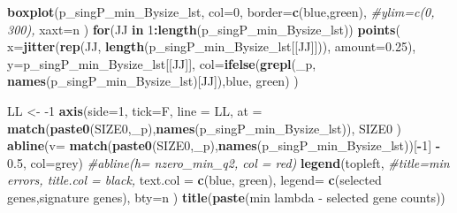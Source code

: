 \documentclass[
]{book}
\newenvironment{Shaded}{\begin{snugshade}}{\end{snugshade}}
\newcommand{\CommentTok}[1]{\textcolor[rgb]{0.56,0.35,0.01}{\textit{#1}}}
\newcommand{\ControlFlowTok}[1]{\textcolor[rgb]{0.13,0.29,0.53}{\textbf{#1}}}
\newcommand{\DataTypeTok}[1]{\textcolor[rgb]{0.13,0.29,0.53}{#1}}
\newcommand{\DecValTok}[1]{\textcolor[rgb]{0.00,0.00,0.81}{#1}}
\newcommand{\FloatTok}[1]{\textcolor[rgb]{0.00,0.00,0.81}{#1}}
\newcommand{\KeywordTok}[1]{\textcolor[rgb]{0.13,0.29,0.53}{\textbf{#1}}}
\newcommand{\NormalTok}[1]{#1}
\newcommand{\OperatorTok}[1]{\textcolor[rgb]{0.81,0.36,0.00}{\textbf{#1}}}
\newcommand{\StringTok}[1]{\textcolor[rgb]{0.31,0.60,0.02}{#1}}
\begin{document}
\begin{Shaded}
\begin{Highlighting}[]
\KeywordTok{boxplot}\NormalTok{(p\_singP\_min\_Bysize\_lst,}
  \DataTypeTok{col=}\DecValTok{0}\NormalTok{,}
  \DataTypeTok{border=}\KeywordTok{c}\NormalTok{(}\StringTok{\textquotesingle{}blue\textquotesingle{}}\NormalTok{,}\StringTok{\textquotesingle{}green\textquotesingle{}}\NormalTok{),}
  \CommentTok{\#ylim=c(0, 300),}
  \DataTypeTok{xaxt=}\StringTok{\textquotesingle{}n\textquotesingle{}}
\NormalTok{)}
\ControlFlowTok{for}\NormalTok{(JJ }\ControlFlowTok{in} \DecValTok{1}\OperatorTok{:}\KeywordTok{length}\NormalTok{(p\_singP\_min\_Bysize\_lst))}
\KeywordTok{points}\NormalTok{(}
   \DataTypeTok{x=}\KeywordTok{jitter}\NormalTok{(}\KeywordTok{rep}\NormalTok{(JJ, }\KeywordTok{length}\NormalTok{(p\_singP\_min\_Bysize\_lst[[JJ]])), }\DataTypeTok{amount=}\FloatTok{0.25}\NormalTok{),}
   \DataTypeTok{y=}\NormalTok{p\_singP\_min\_Bysize\_lst[[JJ]],}
   \DataTypeTok{col=}\KeywordTok{ifelse}\NormalTok{(}\KeywordTok{grepl}\NormalTok{(}\StringTok{\textquotesingle{}\_p\textquotesingle{}}\NormalTok{, }\KeywordTok{names}\NormalTok{(p\_singP\_min\_Bysize\_lst)[JJ]),}\StringTok{\textquotesingle{}blue\textquotesingle{}}\NormalTok{, }\StringTok{\textquotesingle{}green\textquotesingle{}}\NormalTok{)}
\NormalTok{)}

\NormalTok{LL <{-}}\StringTok{ }\DecValTok{{-}1}
\KeywordTok{axis}\NormalTok{(}\DataTypeTok{side=}\DecValTok{1}\NormalTok{, }\DataTypeTok{tick=}\NormalTok{F, }\DataTypeTok{line =}\NormalTok{ LL,}
  \DataTypeTok{at =} \KeywordTok{match}\NormalTok{(}\KeywordTok{paste0}\NormalTok{(SIZE0,}\StringTok{\textquotesingle{}\_p\textquotesingle{}}\NormalTok{),}\KeywordTok{names}\NormalTok{(p\_singP\_min\_Bysize\_lst)),}
\NormalTok{  SIZE0}
\NormalTok{ )}
\KeywordTok{abline}\NormalTok{(}\DataTypeTok{v=} \KeywordTok{match}\NormalTok{(}\KeywordTok{paste0}\NormalTok{(SIZE0,}\StringTok{\textquotesingle{}\_p\textquotesingle{}}\NormalTok{),}\KeywordTok{names}\NormalTok{(p\_singP\_min\_Bysize\_lst))[}\OperatorTok{{-}}\DecValTok{1}\NormalTok{] }\OperatorTok{{-}}\StringTok{ }\FloatTok{0.5}\NormalTok{, }\DataTypeTok{col=}\StringTok{\textquotesingle{}grey\textquotesingle{}}\NormalTok{)}
\CommentTok{\#abline(h= nzero\_min\_q2, col = \textquotesingle{}red\textquotesingle{})}
\KeywordTok{legend}\NormalTok{(}\StringTok{\textquotesingle{}topleft\textquotesingle{}}\NormalTok{,}
   \CommentTok{\#title=\textquotesingle{}min errors\textquotesingle{}, title.col = \textquotesingle{}black\textquotesingle{},}
   \DataTypeTok{text.col =} \KeywordTok{c}\NormalTok{(}\StringTok{\textquotesingle{}blue\textquotesingle{}}\NormalTok{, }\StringTok{\textquotesingle{}green\textquotesingle{}}\NormalTok{),}
   \DataTypeTok{legend=} \KeywordTok{c}\NormalTok{(}\StringTok{\textquotesingle{}selected genes\textquotesingle{}}\NormalTok{,}\StringTok{\textquotesingle{}signature genes\textquotesingle{}}\NormalTok{),}
   \DataTypeTok{bty=}\StringTok{\textquotesingle{}n\textquotesingle{}}
\NormalTok{ )}
\KeywordTok{title}\NormalTok{(}\KeywordTok{paste}\NormalTok{(}\StringTok{\textquotesingle{}min lambda {-} selected gene counts\textquotesingle{}}\NormalTok{))}


\end{Highlighting}
\end{Shaded}
\end{document}
